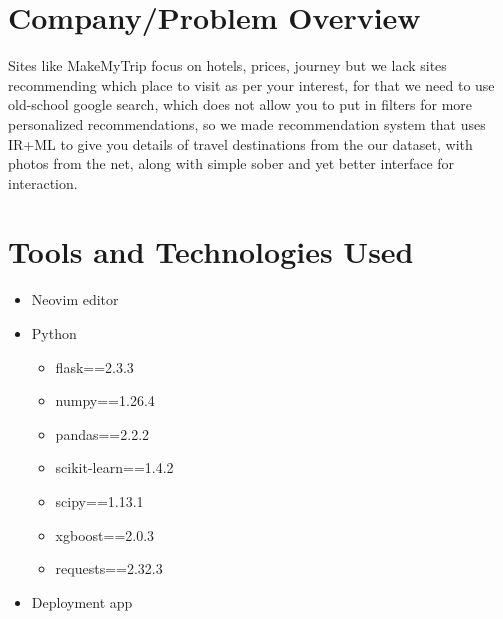 \documentclass[12pt,a4paper]{report}
\begin{document}
\newpage
\section{Company/Problem Overview}
Sites like MakeMyTrip focus on hotels, prices, journey but we lack sites recommending which place to visit as per your interest, for that we need to use old-school google search, which does not allow you to put in filters for more personalized recommendations, so we made recommendation system that uses IR+ML to give you details of travel destinations from the our dataset, with photos from the net,  along with simple sober and yet better interface for interaction.

\newpage
\section{Tools and Technologies Used}
\begin{itemize}
  \item Neovim editor
  \item Python
      \begin{itemize}
          
            \item flask==2.3.3
              
            \item numpy==1.26.4
              
            \item pandas==2.2.2
            \item scikit-learn==1.4.2
            \item scipy==1.13.1
          \item xgboost==2.0.3
          \item requests==2.32.3
      \end{itemize}
  \item Deployment app
\end{itemize}

\newpage
\end{document}
